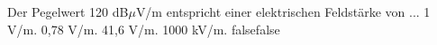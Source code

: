     {Der Pegelwert 120 dB$μ$V/m entspricht einer elektrischen Feldstärke von ...}
    {1 V/m.}
    {0,78 V/m.}
    {41,6 V/m.}
    {1000 kV/m.}
    {false}{false}